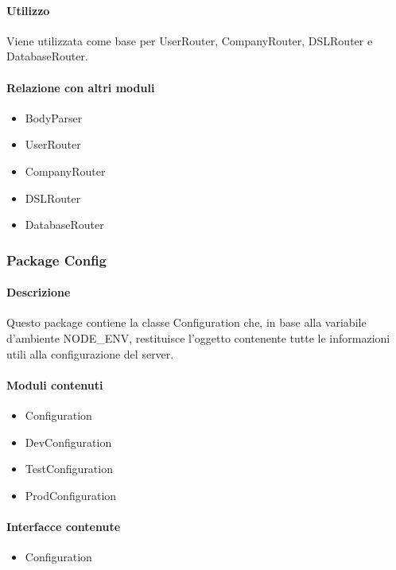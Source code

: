 \paragraph*{Utilizzo}
Viene utilizzata come base per UserRouter, CompanyRouter, DSLRouter e DatabaseRouter.

\paragraph*{Relazione con altri moduli}
\begin{itemize}
\item BodyParser
\item UserRouter
\item CompanyRouter
\item DSLRouter
\item DatabaseRouter
\end{itemize}

\subsubsection{Package Config}
\paragraph*{Descrizione}
Questo package contiene la classe Configuration che, in base alla variabile d'ambiente NODE\_ENV, restituisce l'oggetto contenente tutte le informazioni utili alla configurazione del server.

\paragraph*{Moduli contenuti}
\begin{itemize}
\item Configuration
\item DevConfiguration
\item TestConfiguration
\item ProdConfiguration
\end{itemize}

\paragraph*{Interfacce contenute}
\begin{itemize}
\item Configuration
\end{itemize}

